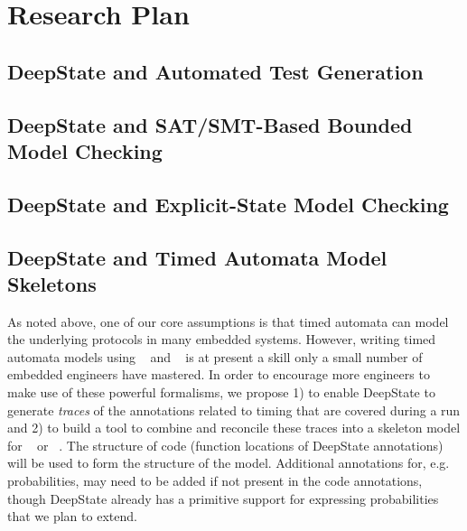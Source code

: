 \section{Research Plan}

%

\subsection{DeepState and Automated Test Generation}
\label{sec:framac2deepstate}


\subsection{DeepState and SAT/SMT-Based Bounded Model Checking}


\subsection{DeepState and Explicit-State Model Checking}


\subsection{DeepState and Timed Automata Model Skeletons}
As noted above, one of our core assumptions is that timed automata can
model the underlying protocols in many embedded systems.  However,
writing timed automata models using \uppaal~\cite{uppaal} and
\prism~\cite{KNP2011:CAV} is at present a skill only a small number of
embedded engineers have mastered.  In order to encourage more
engineers to make use of these powerful formalisms, we propose 1) to
enable DeepState to generate \emph{traces} of the annotations related
to timing that are covered during a run and 2) to build a tool to
combine and reconcile these traces into a skeleton model for \uppaal~\cite{uppaal} or
\prism~\cite{KNP2011:CAV}.  The structure of code (function locations
of DeepState annotations) will be used to form the structure of the
model.  Additional annotations for, e.g. probabilities, may need to be
added if not present in the code annotations, though DeepState already
has a primitive support for expressing probabilities that we plan to extend.

